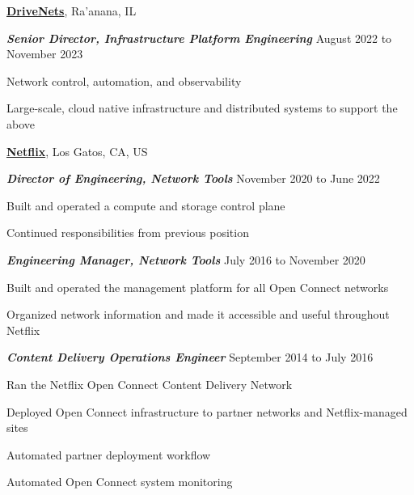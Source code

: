 \documentclass[10pt]{article}
\newenvironment{outerlist}[1][\enskip\textbullet]%
        {\begin{itemize}[#1]}{\end{itemize}%
         \vspace{-.6\baselineskip}}
\newenvironment{innerlist}[1][\enskip\textbullet]%
        {\begin{compactitem}[#1]}{\end{compactitem}}
\newcommand{\blankline}{\quad\pagebreak[2]}
\begin{document}
\blankline

\href{https://drivenets.com}{\textbf{DriveNets}},
Ra'anana, IL
\begin{outerlist}
\item[] \textit{\textbf{Senior Director, Infrastructure Platform Engineering}}
  \hfill August 2022 to November 2023
  \begin{innerlist}
  \item Network control, automation, and observability
  \item Large-scale, cloud native infrastructure and distributed systems to support the above
  \end{innerlist}
\end{outerlist}

\blankline

\href{https://openconnect.netflix.com}{\textbf{Netflix}},
Los Gatos, CA, US
\begin{outerlist}
\item[] \textit{\textbf{Director of Engineering, Network Tools}}
  \hfill November 2020 to June 2022
  \begin{innerlist}
  \item Built and operated a compute and storage control plane
  \item Continued responsibilities from previous position
  \end{innerlist}

\item[] \textit{\textbf{Engineering Manager, Network Tools}}
  \hfill July 2016 to November 2020
  \begin{innerlist}
  \item Built and operated the management platform for all Open Connect networks
  \item Organized network information and made it accessible and useful throughout Netflix
  \end{innerlist}

\item[] \textit{\textbf{Content Delivery Operations Engineer}}
  \hfill September 2014 to July 2016
  \begin{innerlist}
  \item Ran the Netflix Open Connect Content Delivery Network
  \item Deployed Open Connect infrastructure to partner networks and Netflix-managed sites
  \item Automated partner deployment workflow
  \item Automated Open Connect system monitoring
  \end{innerlist}
\end{outerlist}
\end{document}
